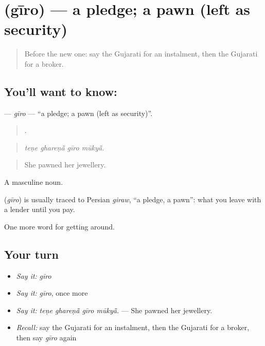 \section[\texorpdfstring{\gu{ગીરો} (gīro)}{ગીરો (gīro)}]{ (gīro) — a pledge; a pawn (left as security)}

\label{lesson:GU-C425-giro}



\begin{quote}
Before the new one: say the Gujarati for an instalment, then the Gujarati for a broker.
\end{quote}

\subsection*{You'll want to know: }
\textbf{} — \emph{gīro} — \textquotedblleft{}a pledge; a pawn (left as security)\textquotedblright{}.

\begin{quote}
   .
\end{quote}

\begin{quote}
\emph{teṇe ghareṇā̃ gīro mūkyā̃.}
\end{quote}

\begin{quote}
She pawned her jewellery.
\end{quote}

A masculine noun.

\begin{cousinweb}
\textbf{} (\emph{gīro}) is usually traced to Persian \emph{giraw}, \textquotedblleft{}a pledge, a pawn\textquotedblright{}: what you leave with a lender until you pay.
\end{cousinweb}

\begin{grammarlens}[title={What you've built}]
One more word for getting around.
\end{grammarlens}

\subsection*{Your turn}
\begin{itemize}
\raggedright
  \item \emph{Say it:} \emph{gīro}
  \item \emph{Say it:} \emph{gīro}, once more
  \item \emph{Say it:} \emph{teṇe ghareṇā̃ gīro mūkyā̃.} — She pawned her jewellery.
  \item \emph{Recall:} say the Gujarati for an instalment, then the Gujarati for a broker, then say \emph{gīro} again
\end{itemize}

